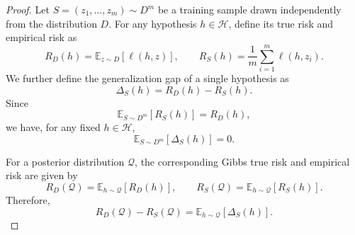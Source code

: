 \documentclass{article}
\theoremstyle{plain}
\theoremstyle{definition}
\theoremstyle{remark}
\begin{document}
\begin{proof}
Let $S=(z_1,\ldots,z_m)\sim D^m$ be a training sample drawn independently from the distribution $D$. For any hypothesis $h\in\mathcal H$, define its true risk and empirical risk as
\begin{equation}
R_D(h)=\mathbb E_{z\sim D}[\ell(h,z)],
\qquad
R_S(h)=\frac{1}{m}\sum_{i=1}^m \ell(h,z_i).
\end{equation}
We further define the generalization gap of a single hypothesis as
\begin{equation}
\Delta_S(h)=R_D(h)-R_S(h).
\end{equation}
Since
\begin{equation}
\mathbb E_{S\sim D^m}[R_S(h)]
=
R_D(h),
\end{equation}
we have, for any fixed $h\in\mathcal H$,
\begin{equation}
\mathbb E_{S\sim D^m}[\Delta_S(h)]=0.
\end{equation}

For a posterior distribution $\mathcal Q$, the corresponding Gibbs true risk and empirical risk are given by
\begin{equation}
R_D(\mathcal Q)
=
\mathbb E_{h\sim\mathcal Q}[R_D(h)],
\qquad
R_S(\mathcal Q)
=
\mathbb E_{h\sim\mathcal Q}[R_S(h)].
\end{equation}
Therefore,
\begin{equation}
R_D(\mathcal Q)-R_S(\mathcal Q)
=
\mathbb E_{h\sim\mathcal Q}[\Delta_S(h)].
\end{equation}


\end{proof}
\end{document}
